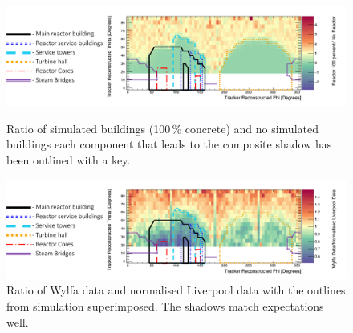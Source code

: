 \begin{figure}
  \centering
    \includegraphics[width=1\linewidth]{Chapter6/Figs/Raster/wylfaSimulatedShadowsWithKey.png}
    \caption{Ratio of simulated buildings (100\,\% concrete) and no simulated buildings each component that leads to the composite shadow has been outlined with a key.}
  \label{fig:simulatedTrackerRecon}
    \includegraphics[width=1\linewidth]{Chapter6/Figs/Raster/wylfaMeasuredShadowsWithKey.png}
    \caption{Ratio of Wylfa data and normalised Liverpool data with the outlines from simulation superimposed. The shadows match expectations well.}
  \label{fig:measuredTrackerRecon}
\end{figure}




